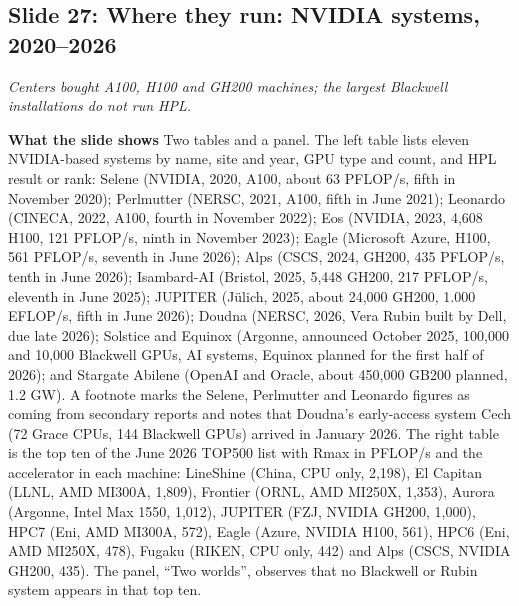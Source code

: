 \documentclass[11pt,letterpaper]{article}
\newcommand{\slide}[3]{%
  \subsection[Slide #1: #2]{Slide #1: #2}%
  {\color{muted}\itshape #3\par}\medskip}
\newcommand{\para}[1]{\medskip\noindent\textbf{#1}\quad}
\begin{document}
\slide{27}{Where they run: NVIDIA systems, 2020--2026}{Centers bought A100, H100 and GH200 machines; the largest Blackwell installations do not run HPL.}

\para{What the slide shows} Two tables and a panel. The left table lists eleven NVIDIA-based systems by name, site and year, GPU type and count, and HPL result or rank: Selene (NVIDIA, 2020, A100, about 63 PFLOP/s, fifth in November 2020); Perlmutter (NERSC, 2021, A100, fifth in June 2021); Leonardo (CINECA, 2022, A100, fourth in November 2022); Eos (NVIDIA, 2023, 4,608 H100, 121 PFLOP/s, ninth in November 2023); Eagle (Microsoft Azure, H100, 561 PFLOP/s, seventh in June 2026); Alps (CSCS, 2024, GH200, 435 PFLOP/s, tenth in June 2026); Isambard-AI (Bristol, 2025, 5,448 GH200, 217 PFLOP/s, eleventh in June 2025); JUPITER (J\"ulich, 2025, about 24,000 GH200, 1.000 EFLOP/s, fifth in June 2026); Doudna (NERSC, 2026, Vera Rubin built by Dell, due late 2026); Solstice and Equinox (Argonne, announced October 2025, 100,000 and 10,000 Blackwell GPUs, AI systems, Equinox planned for the first half of 2026); and Stargate Abilene (OpenAI and Oracle, about 450,000 GB200 planned, 1.2 GW). A footnote marks the Selene, Perlmutter and Leonardo figures as coming from secondary reports and notes that Doudna's early-access system Cech (72 Grace CPUs, 144 Blackwell GPUs) arrived in January 2026. The right table is the top ten of the June 2026 TOP500 list with Rmax in PFLOP/s and the accelerator in each machine: LineShine (China, CPU only, 2,198), El Capitan (LLNL, AMD MI300A, 1,809), Frontier (ORNL, AMD MI250X, 1,353), Aurora (Argonne, Intel Max 1550, 1,012), JUPITER (FZJ, NVIDIA GH200, 1,000), HPC7 (Eni, AMD MI300A, 572), Eagle (Azure, NVIDIA H100, 561), HPC6 (Eni, AMD MI250X, 478), Fugaku (RIKEN, CPU only, 442) and Alps (CSCS, NVIDIA GH200, 435). The panel, ``Two worlds'', observes that no Blackwell or Rubin system appears in that top ten.
\end{document}
